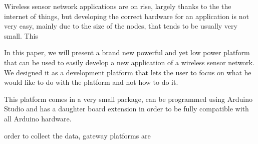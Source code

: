 Wireless sensor network applications are on rise, largely thanks to the the internet of things, but developing the correct hardware for an application is not very easy, mainly due to the size of the nodes, that tends to be usually very small. This

In this paper, we will present a brand new powerful and yet low power platform that can be used to easily develop a new application of a wireless sensor network. We designed it as a development platform that lets the user to focus on what he would like to do with the platform and not how to do it.

This platform comes in a very small package, can be programmed using Arduino Studio and has a daughter board extension in order to be fully compatible with all Arduino hardware.

order to collect the data, gateway platforms \cite{steenkamp2009wireless} are
